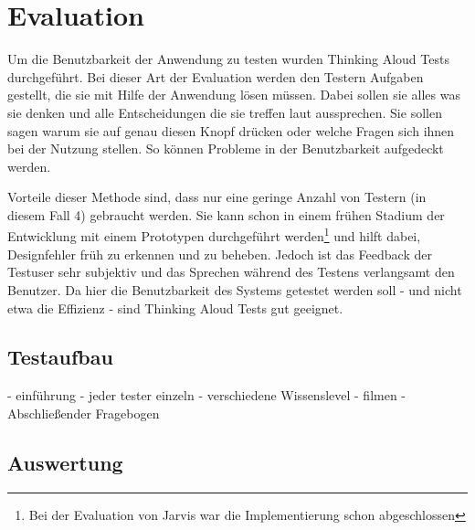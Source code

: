 \section{Evaluation}
Um die Benutzbarkeit der Anwendung zu testen wurden Thinking Aloud Tests durchgeführt. Bei dieser Art der Evaluation werden den Testern Aufgaben gestellt, die sie mit Hilfe der Anwendung lösen müssen. Dabei sollen sie alles was sie denken und alle Entscheidungen die sie treffen laut aussprechen. Sie sollen sagen warum sie auf genau diesen Knopf drücken oder welche Fragen sich ihnen bei der Nutzung stellen. So können Probleme in der Benutzbarkeit aufgedeckt werden.

Vorteile dieser Methode sind, dass nur eine geringe Anzahl von Testern (in diesem Fall 4) gebraucht werden. Sie kann schon in einem frühen Stadium der Entwicklung mit einem Prototypen durchgeführt werden\footnote{Bei der Evaluation von Jarvis war die Implementierung schon abgeschlossen} und hilft dabei, Designfehler früh zu erkennen und zu beheben. Jedoch ist das Feedback der Testuser sehr subjektiv und das Sprechen während des Testens verlangsamt den Benutzer. Da hier die Benutzbarkeit des Systems getestet werden soll - und nicht etwa die Effizienz - sind Thinking Aloud Tests gut geeignet.

 \subsection{Testaufbau}
 - einführung
 - jeder tester einzeln
 - verschiedene Wissenslevel
 - filmen
 - Abschließender Fragebogen
 \subsection{Auswertung}